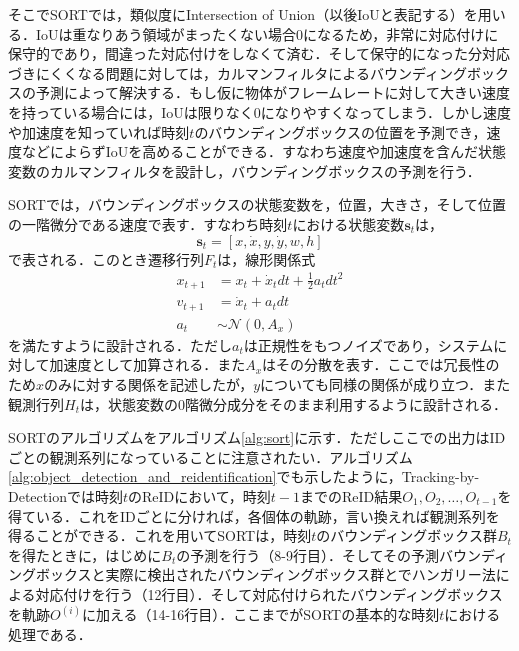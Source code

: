     そこでSORTでは，類似度にIntersection of Union（以後IoUと表記する）を用いる．IoUは重なりあう領域がまったくない場合$0$になるため，非常に対応付けに保守的であり，間違った対応付けをしなくて済む．そして保守的になった分対応づきにくくなる問題に対しては，カルマンフィルタによるバウンディングボックスの予測によって解決する．もし仮に物体がフレームレートに対して大きい速度を持っている場合には，IoUは限りなく0になりやすくなってしまう．しかし速度や加速度を知っていれば時刻$t$のバウンディングボックスの位置を予測でき，速度などによらずIoUを高めることができる．すなわち速度や加速度を含んだ状態変数のカルマンフィルタを設計し，バウンディングボックスの予測を行う．

    SORTでは，バウンディングボックスの状態変数を，位置，大きさ，そして位置の一階微分である速度で表す．すなわち時刻$t$における状態変数$\bm{s}_t$は，
    \begin{equation}
        \label{eq:sort_state_vector}
        \bm{s}_t = \left[x, \dot{x}, y, \dot{y}, w, h\right]
    \end{equation}
    で表される．このとき遷移行列$F_t$は，線形関係式
    \begin{equation}
        \label{eq:sort_transition}
        \begin{aligned}
            x_{t+1} &= x_t + \dot{x}_t dt + \frac{1}{2} a_t dt^2
            \\v_{t+1} &= \dot{x}_t + a_t dt
            \\a_t &\sim \mathcal{N}(0, A_x)
        \end{aligned}
    \end{equation}
    を満たすように設計される．ただし$a_t$は正規性をもつノイズであり，システムに対して加速度として加算される．また$A_x$はその分散を表す．ここでは冗長性のため$x$のみに対する関係を記述したが，$y$についても同様の関係が成り立つ．また観測行列$H_t$は，状態変数の$0$階微分成分をそのまま利用するように設計される．

    SORTのアルゴリズムをアルゴリズム\ref{alg:sort}に示す．ただしここでの出力はIDごとの観測系列になっていることに注意されたい．アルゴリズム\ref{alg:object_detection_and_reidentification}でも示したように，Tracking-by-Detectionでは時刻$t$のReIDにおいて，時刻$t-1$までのReID結果$O_1, O_2, \dots, O_{t-1}$を得ている．これをIDごとに分ければ，各個体の軌跡，言い換えれば観測系列を得ることができる．これを用いてSORTは，時刻$t$のバウンディングボックス群$B_t$を得たときに，はじめに$B_t$の予測を行う（8-9行目）．そしてその予測バウンディングボックスと実際に検出されたバウンディングボックス群とでハンガリー法による対応付けを行う（12行目）．そして対応付けられたバウンディングボックスを軌跡$O^{(i)}$に加える（14-16行目）．ここまでがSORTの基本的な時刻$t$における処理である．
    
